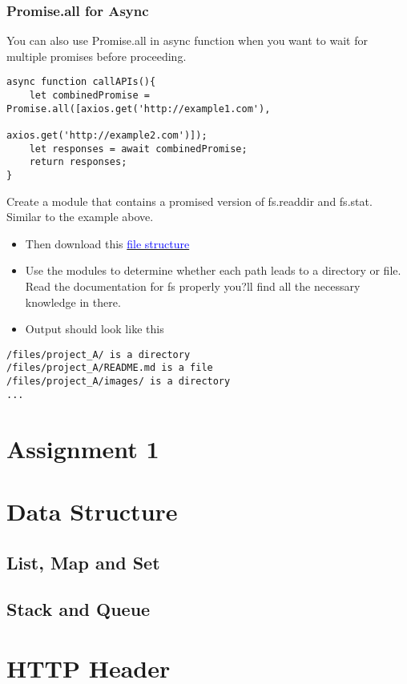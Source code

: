 \documentclass[a4paper]{article}
\begin{document}
\subsubsection{Promise.all for Async}
You can also use Promise.all in async function when you want to wait for multiple promises before proceeding.
\begin{lstlisting}
async function callAPIs(){
    let combinedPromise = Promise.all([axios.get('http://example1.com'),
                                        axios.get('http://example2.com')]);
    let responses = await combinedPromise;
    return responses;
}
\end{lstlisting}
\begin{eg}
Create a module that contains a promised version of fs.readdir and fs.stat. Similar to the example above.\\
\begin{itemize}
\item Then download this \href{https://drive.google.com/file/d/0BwsQDCAXyIETQnR6akExb1AtX3c/view}{\textcolor{blue}{file structure}}
\item Use the modules to determine whether each path leads to a directory or file. Read the documentation for fs properly you?ll find all the necessary knowledge in there.
\item Output should look like this
\end{itemize}
\begin{lstlisting}
/files/project_A/ is a directory
/files/project_A/README.md is a file
/files/project_A/images/ is a directory
...
\end{lstlisting}
\end{eg}


\section{Assignment 1}


\section{Data Structure}
\subsection{List, Map and Set}
\subsection{Stack and Queue}

\section{HTTP Header}
\end{document}
